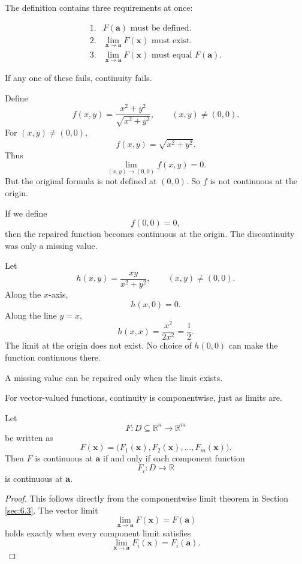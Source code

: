 The definition contains three requirements at once:

\[
\begin{array}{ll}
\text{1.} & F(\mathbf a)\text{ must be defined.}\\[1mm]
\text{2.} & \displaystyle \lim_{\mathbf x\to\mathbf a}F(\mathbf x)\text{ must exist.}\\[3mm]
\text{3.} & \displaystyle \lim_{\mathbf x\to\mathbf a}F(\mathbf x)\text{ must equal }F(\mathbf a).
\end{array}
\]

If any one of these fails, continuity fails.

\begin{example}
Define
\[
    f(x,y)=\frac{x^2+y^2}{\sqrt{x^2+y^2}},
    \qquad (x,y)\ne(0,0).
\]
For \((x,y)\ne(0,0)\),
\[
    f(x,y)=\sqrt{x^2+y^2}.
\]
Thus
\[
    \lim_{(x,y)\to(0,0)} f(x,y)=0.
\]
But the original formula is not defined at \((0,0)\).  So \(f\) is not continuous at
the origin.

If we define
\[
    f(0,0)=0,
\]
then the repaired function becomes continuous at the origin.  The discontinuity was
only a missing value.
\end{example}

\begin{example}
Let
\[
    h(x,y)=\frac{xy}{x^2+y^2},
    \qquad (x,y)\ne(0,0).
\]
Along the \(x\)-axis,
\[
    h(x,0)=0.
\]
Along the line \(y=x\),
\[
    h(x,x)=\frac{x^2}{2x^2}=\frac12.
\]
The limit at the origin does not exist.  No choice of \(h(0,0)\) can make the function
continuous there.

A missing value can be repaired only when the limit exists.
\end{example}

For vector-valued functions, continuity is componentwise, just as limits are.

\begin{theorem}
Let
\[
    F:D\subseteq\mathbb R^n\to\mathbb R^m
\]
be written as
\[
    F(\mathbf x)=
    \bigl(F_1(\mathbf x),F_2(\mathbf x),\ldots,F_m(\mathbf x)\bigr).
\]
Then \(F\) is continuous at \(\mathbf a\) if and only if each component function
\[
    F_i:D\to\mathbb R
\]
is continuous at \(\mathbf a\).
\end{theorem}

\begin{proof}
This follows directly from the componentwise limit theorem in Section \ref{sec:6.3}.
The vector limit
\[
    \lim_{\mathbf x\to\mathbf a}F(\mathbf x)=F(\mathbf a)
\]
holds exactly when every component limit satisfies
\[
    \lim_{\mathbf x\to\mathbf a}F_i(\mathbf x)=F_i(\mathbf a).
\]
\end{proof}

